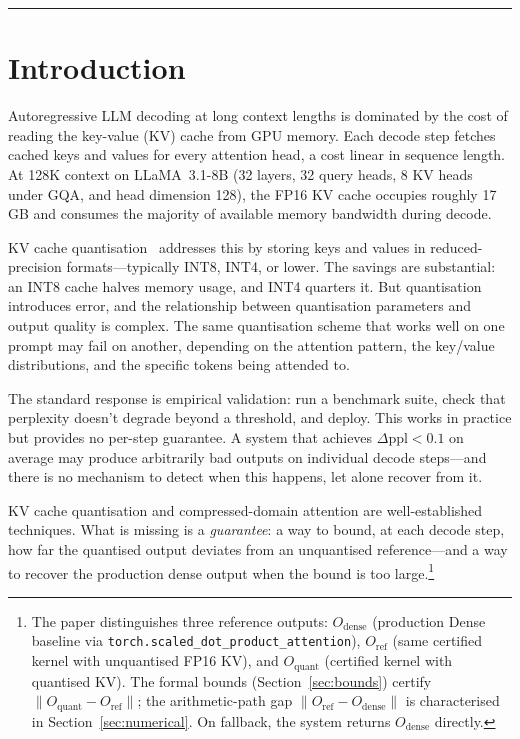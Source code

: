 \documentclass[11pt,a4paper]{article}
\theoremstyle{definition}
\theoremstyle{remark}
\newcommand{\norm}[1]{\lVert #1 \rVert}
\newcommand{\torchsdpa}{\texttt{torch.scaled\_dot\_\hspace{0pt}product\_attention}}
\begin{document}
\vspace{8pt}
\hrule
\vspace{10pt}

\tableofcontents

\newpage

\section{Introduction}
\label{sec:intro}

Autoregressive LLM decoding at long context lengths is dominated by the cost of reading the key-value (KV) cache from GPU memory.  Each decode step fetches cached keys and values for every attention head, a cost linear in sequence length.  At 128K context on LLaMA~3.1-8B (32 layers, 32 query heads, 8 KV heads under GQA, and head dimension 128), the FP16 KV cache occupies roughly 17\,GB and consumes the majority of available memory bandwidth during decode.

KV cache quantisation~\cite{kvquant,kivi,qjl,innerq} addresses this by storing keys and values in reduced-precision formats---typically INT8, INT4, or lower.  The savings are substantial: an INT8 cache halves memory usage, and INT4 quarters it.  But quantisation introduces error, and the relationship between quantisation parameters and output quality is complex.  The same quantisation scheme that works well on one prompt may fail on another, depending on the attention pattern, the key/value distributions, and the specific tokens being attended to.

The standard response is empirical validation: run a benchmark suite, check that perplexity doesn't degrade beyond a threshold, and deploy.  This works in practice but provides no per-step guarantee.  A system that achieves $\Delta\text{ppl} < 0.1$ on average may produce arbitrarily bad outputs on individual decode steps---and there is no mechanism to detect when this happens, let alone recover from it.

KV cache quantisation and compressed-domain attention are well-established techniques.  What is missing is a \emph{guarantee}: a way to bound, at each decode step, how far the quantised output deviates from an unquantised reference---and a way to recover the production dense output when the bound is too large.\footnote{The paper distinguishes three reference outputs: $O_{\mathrm{dense}}$ (production Dense baseline via \torchsdpa{}), $O_{\mathrm{ref}}$ (same certified kernel with unquantised FP16 KV), and $O_{\mathrm{quant}}$ (certified kernel with quantised KV).  The formal bounds (Section~\ref{sec:bounds}) certify $\norm{O_{\mathrm{quant}} - O_{\mathrm{ref}}}$; the arithmetic-path gap $\norm{O_{\mathrm{ref}} - O_{\mathrm{dense}}}$ is characterised in Section~\ref{sec:numerical}.  On fallback, the system returns $O_{\mathrm{dense}}$ directly.}
\end{document}
